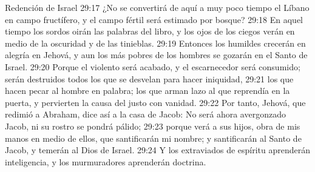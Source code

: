 Redención de Israel 
29:17 ¿No se convertirá de aquí a muy poco tiempo el Líbano en campo fructífero, y el campo fértil será estimado por bosque? 
29:18 En aquel tiempo los sordos oirán las palabras del libro, y los ojos de los ciegos verán en medio de la oscuridad y de las tinieblas. 
29:19 Entonces los humildes crecerán en alegría en Jehová, y aun los más pobres de los hombres se gozarán en el Santo de Israel. 
29:20 Porque el violento será acabado, y el escarnecedor será consumido; serán destruidos todos los que se desvelan para hacer iniquidad, 
29:21 los que hacen pecar al hombre en palabra; los que arman lazo al que reprendía en la puerta, y pervierten la causa del justo con vanidad. 
29:22 Por tanto, Jehová, que redimió a Abraham, dice así a la casa de Jacob: No será ahora avergonzado Jacob, ni su rostro se pondrá pálido; 
29:23 porque verá a sus hijos, obra de mis manos en medio de ellos, que santificarán mi nombre; y santificarán al Santo de Jacob, y temerán al Dios de Israel. 
29:24 Y los extraviados de espíritu aprenderán inteligencia, y los murmuradores aprenderán doctrina. 
